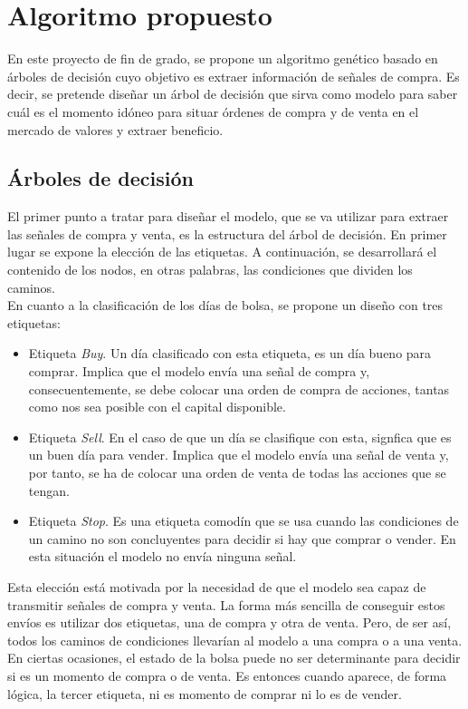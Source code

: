 \section{Algoritmo propuesto}\label{sec:algorithm}

En este proyecto de fin de grado, se propone un algoritmo gen\'etico basado en \'arboles de decisi\'on cuyo objetivo es extraer informaci\'on de se\~nales de compra. Es decir, se pretende dise\~nar un \'arbol de decisi\'on que sirva como modelo para saber cu\'al es el momento id\'oneo para situar \'ordenes de compra y de venta en el mercado de valores y extraer beneficio.\\

\subsection{\'Arboles de decisi\'on}
El primer punto a tratar para dise\~nar el modelo, que se va  utilizar para extraer las se\~nales de compra y venta, es la estructura del \'arbol de decisi\'on. En primer lugar se expone la elecci\'on de las etiquetas. A continuaci\'on, se desarrollar\'a el contenido de los nodos, en otras palabras, las condiciones que dividen los caminos.\\

En cuanto a la clasificaci\'on de los d\'ias de bolsa, se propone un dise\~no con tres etiquetas:
\begin{itemize}
    \item Etiqueta \textit{Buy}. Un d\'ia clasificado con esta etiqueta, es un d\'ia bueno para comprar. Implica que el modelo env\'ia una se\~nal de compra y, consecuentemente, se debe colocar una orden de compra de acciones, tantas como nos sea posible con el capital disponible.
    \item Etiqueta \textit{Sell}. En el caso de que un d\'ia se clasifique con esta, signfica que es un buen d\'ia para vender. Implica que el modelo env\'ia una se\~nal de venta y, por tanto, se ha de colocar una orden de venta de todas las acciones que se tengan.
    \item Etiqueta \textit{Stop}. Es una etiqueta comod\'in que se usa cuando las condiciones de un camino no son concluyentes para decidir si hay que comprar o vender. En esta situaci\'on el modelo no env\'ia ninguna se\~nal.
\end{itemize}

Esta elecci\'on est\'a motivada por la necesidad de que el modelo sea capaz de transmitir se\~nales de compra y venta. La forma m\'as sencilla de conseguir estos env\'ios es utilizar dos etiquetas, una de compra y otra de venta. Pero, de ser as\'i, todos los caminos de condiciones llevar\'ian al modelo a una compra o a una venta. En ciertas ocasiones, el estado de la bolsa puede no ser determinante para decidir si es un momento de compra o de venta. Es entonces cuando aparece, de forma l\'ogica, la tercer etiqueta, ni es momento de comprar ni lo es de vender. \\

